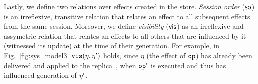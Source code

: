 Lastly, we define two relations over effects created in the store.
\emph{Session order} (${\textsf{so}}$) is an irreflexive, transitive relation that relates
an effect to all subsequent effects from the same session.
Moreover, we define 
\emph{visibility} (${{\normalfont \textsf{vis}}}$) 
as an irreflexive and assymetric relation that 
relates an effects to all others that are influenced by it (witnessed its
update) at the time of their generation.
For example, in Fig.~\ref{fig:sys_model3} ${\normalfont \texttt{vis}}
(\eta,\eta')$ holds, since $\eta$ (the effect of ${\normalfont \texttt{op}}$) has already been
delivered and applied to the replica~, when ${\normalfont \texttt{op}}'$ is executed and thus has influenced 
generation of $\eta'$.
















































































